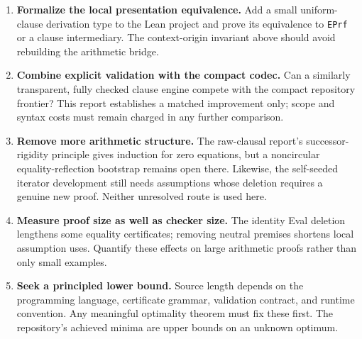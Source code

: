 \documentclass[11pt,letterpaper]{article}
\theoremstyle{definition}\newtheorem{definition}[theorem]{Definition}
\begin{document}
\begin{enumerate}
\item \textbf{Formalize the local presentation equivalence.} Add a small
uniform-clause derivation type to the Lean project and prove its equivalence
to \texttt{EPrf} or a clause intermediary. The context-origin invariant
above should avoid rebuilding the arithmetic bridge.
\item \textbf{Combine explicit validation with the compact codec.} Can a
similarly transparent, fully checked clause engine compete with the compact
repository frontier? This report establishes a matched improvement only;
scope and syntax costs must remain charged in any further comparison.
\item \textbf{Remove more arithmetic structure.} The raw-clausal report's
successor-rigidity principle gives induction for zero equations, but a
noncircular equality-reflection bootstrap remains open there. Likewise,
the self-seeded iterator development still needs assumptions whose deletion
requires a genuine new proof. Neither unresolved route is used here.
\item \textbf{Measure proof size as well as checker size.} The identity
Eval deletion lengthens some equality certificates; removing neutral
premises shortens local assumption uses. Quantify these effects on large
arithmetic proofs rather than only small examples.
\item \textbf{Seek a principled lower bound.} Source length depends on
the programming language, certificate grammar, validation contract, and
runtime convention. Any meaningful optimality theorem must fix these first.
The repository's achieved minima are upper bounds on an unknown optimum.
\end{enumerate}
\end{document}
